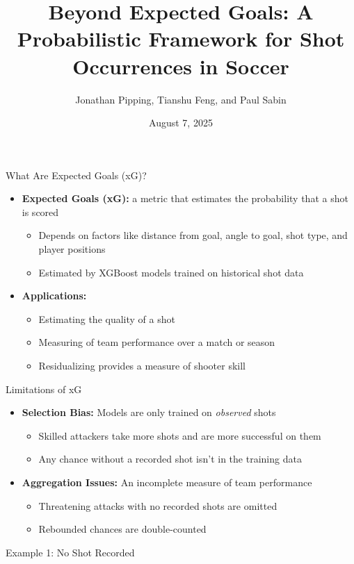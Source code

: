 \documentclass{beamer}
\title[Beyond Expected Goals]{Beyond Expected Goals: A Probabilistic Framework for Shot Occurrences in Soccer}
\author[Pipping, Feng, and Sabin]{Jonathan Pipping, Tianshu Feng, and Paul Sabin}
\date{August 7, 2025}
\institute[UPenn]{University of Pennsylvania}
\begin{document}
\frame{\titlepage}

\begin{frame}{What Are Expected Goals (xG)?}
\begin{itemize}
\item \textbf{Expected Goals (xG):} a metric that estimates the probability that a shot is scored
\begin{itemize}
  \item Depends on factors like distance from goal, angle to goal, shot type, and player positions
  \item Estimated by XGBoost models trained on historical shot data
\end{itemize}
\item  \textbf{Applications:}
  \begin{itemize}
  \item Estimating the quality of a shot
  \item Measuring of team performance over a match or season
  \item Residualizing provides a measure of shooter skill
  \end{itemize}
\end{itemize}
\end{frame}

\begin{frame}{Limitations of xG}
\begin{itemize}
\item \textbf{Selection Bias:} Models are only trained on \emph{observed} shots
  \begin{itemize}
  \item Skilled attackers take more shots and are more successful on them
  \item Any chance without a recorded shot isn't in the training data
  \end{itemize}
\item \textbf{Aggregation Issues:} An incomplete measure of team performance
\begin{itemize}
  \item Threatening attacks with no recorded shots are omitted
  \item Rebounded chances are double-counted
\end{itemize}
\end{itemize}
\end{frame}

\begin{frame}{Example 1: No Shot Recorded}

\end{frame}
\end{document}
